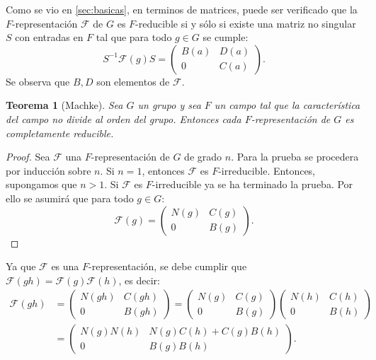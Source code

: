 \documentclass[12pt]{book}
\newtheorem{theorem}{Teorema}[section]
\theoremstyle{definition}
\newcounter{in}
\begin{document}
Como se vio en \ref{sec:basicas}, en terminos de matrices, puede ser
verificado que la $F$-representación $\mathcal{F}$ de $G$ es
$F$-reducible si y sólo si existe una matriz no singular $S$ con
entradas en $F$ tal que para todo $g \in G$ se cumple:
\begin{equation*}
  S^{-1}\mathcal{F}(g)S=
  \begin{pmatrix}
    B\left(a\right) & D\left(a\right) \\
    0 & C\left(a\right)
  \end{pmatrix}. 
\end{equation*}  
Se observa que $B, D$ son elementos de $\mathcal{F}$.
\begin{theorem}[Machke]
  \label{tma}
  Sea $G$ un grupo y sea $F$ un campo tal que la característica del
  campo no divide al orden del grupo. Entonces cada $F$-representación
  de $G$ es completamente reducible.
\end{theorem}
\begin{proof}
  Sea $\mathcal{F}$ una $F$-representación de $G$ de grado $n$. Para
  la prueba se procedera por inducción sobre $n$. Si $n=1$, entonces
  $\mathcal{F}$ es $F$-irreducible. Entonces, supongamos que $n >
  1$. Si $\mathcal{F}$ es $F$-irreducible ya se ha terminado la
  prueba. Por ello se asumirá que para todo $g \in G$:
  \begin{equation*}
  \mathcal{F}(g)=
  \begin{pmatrix}
    N(g) & C(g) \\
    0 & B(g)
  \end{pmatrix}. 
\end{equation*}
\end{proof}
Ya que $\mathcal{F}$ es una $F$-representación, se debe cumplir que
$\mathcal{F}(gh) = \mathcal{F}(g)\mathcal{F}(h)$, es decir:
  \begin{equation}
    \label{eq:73}
    \begin{aligned}
  \mathcal{F}(gh) &=
  \begin{pmatrix}
    N(gh) & C(gh) \\
    0 & B(gh)
  \end{pmatrix}
  =
    \begin{pmatrix}
    N(g) & C(g) \\
    0 & B(g)
  \end{pmatrix}
    \begin{pmatrix}
    N(h) & C(h) \\
    0 & B(h)
  \end{pmatrix} \\
  & =
    \begin{pmatrix}
    N(g)N(h) & N(g)C(h)+C(g)B(h) \\
    0 & B(g)B(h)
  \end{pmatrix}.
\end{aligned}
\end{equation}
\end{document}
